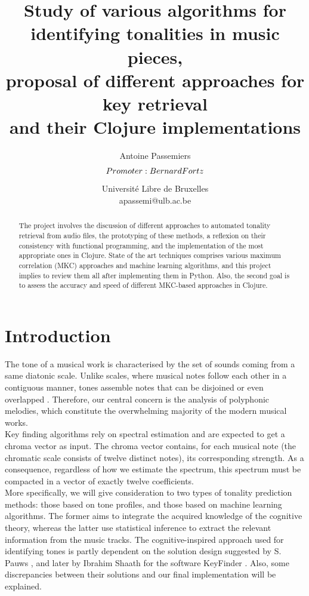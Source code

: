 \documentclass[letterpaper]{article}
\title{Study of various algorithms for identifying tonalities in music pieces, \\ proposal of different approaches for key retrieval \\ and their Clojure implementations}
\author{Antoine Passemiers$$ \\
Promoter: Bernard Fortz\\
\mbox{}\\
$$Université Libre de Bruxelles \\
apassemi@ulb.ac.be}
\begin{document}
\maketitle

\renewcommand\bibname{References}        %
\renewcommand{\refname}{References}
\makeatletter
\renewcommand\@biblabel[1]{#1.  }
\makeatother

\setcounter{secnumdepth}{3}

\begin{abstract}
The project involves the discussion of different approaches to automated tonality retrieval from audio files,
the prototyping of these methods, a reflexion on their consistency with functional programming,
and the implementation of the most appropriate ones in Clojure.
State of the art techniques comprises various maximum correlation (MKC) approaches and machine learning algorithms, and this
project implies to review them all after implementing them in Python. Also, the second goal is to
assess the accuracy and speed of different MKC-based approaches in Clojure.
\end{abstract}

\section{Introduction}

The tone of a musical work is characterised by the set of sounds coming from a same diatonic scale.
Unlike scales, where musical notes follow each other in a contiguous manner, tones assemble notes that can be
disjoined or even overlapped \citep{AD}.
Therefore, our central concern is the analysis of polyphonic melodies, which constitute the overwhelming
majority of the modern musical works.\\

Key finding algorithms rely on spectral estimation and are expected to get a chroma vector as input. The chroma vector contains, for each musical note (the chromatic scale consists of twelve distinct notes), its corresponding strength. As a consequence, regardless of how we estimate the spectrum, this spectrum must be compacted in a vector of exactly twelve coefficients.\\

More specifically, we will give consideration to two types of tonality prediction methods:
those based on tone profiles, and those based on machine learning algorithms.
The former aims to integrate the acquired knowledge of the cognitive theory, whereas the latter
use statistical inference to extract the relevant information from the music tracks.
The cognitive-inspired approach used for identifying tones is partly dependent on the solution design suggested by S. Pauws \citep{SP}, and later by
Ibrahim Sha\textquotesingle ath for the software KeyFinder \citep{IS}. Also, some discrepancies between their solutions and our final implementation will be explained. \\
\end{document}
